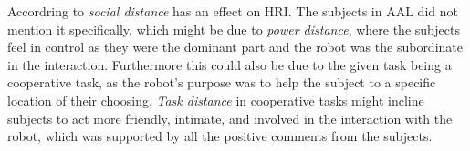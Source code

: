 Accordring to \cite{PDF:HowSocialDistanceShapesHRI} \textit{social distance} has an effect on HRI. The subjects in AAL did not mention it specifically, which might be due to \textit{power distance}, where the subjects feel in control as they were the dominant part and the robot was the subordinate in the interaction. Furthermore this could also be due to the given task being a cooperative task, as the robot's purpose was to help the subject to a specific location of their choosing. \textit{Task distance} in cooperative tasks might incline subjects to act more friendly, intimate, and involved in the interaction with the robot, which was supported by all the positive comments from the subjects. 

